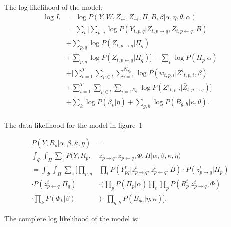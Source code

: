 \label{sec:appendix}

The log-likelihood of the model:
\begin{align}
\log L &= \log \! P(Y, W, Z_{\leftarrow}, 
Z_{\rightarrow}, \Pi, B, \beta | \alpha, \eta, \theta, \alpha) \nonumber\\
\nonumber &= \sum_{t} \bigg[ \sum_{p,q} \! \log P(Y_{t,p, q} | Z_{t,p \rightarrow q} 
     , Z_{t,p \leftarrow q}, B) \\ \nonumber 
     &+ \sum_{p,q} \log P(Z_{t, p \rightarrow q} | \Pi_q) \\ \nonumber 
     & + \sum_{p,q} \log \! P(Z_{t, p \leftarrow q} | \Pi_{q}) \bigg] 
     + \sum_{p} \log \! P(\Pi_{p} | \alpha)  \\ \nonumber 
     & + \bigg[ \sum_{t=1}^{T} \! \sum_{p \in t} \sum_{i=1}^{N_{T_{p}}} 
     \log \! P(w_{t,p,i} | Z'_{t,p,i}, \beta) \\ \nonumber 
     & + \sum_{t=1}^{T} \sum_{p \in t} \sum_{i=1^{N_{T_{p}}}} \log \! 
     P(Z'_{t,p,i} | \bar{Z}_{t, p \rightarrow q}) \bigg]   
     \\ \nonumber & + \sum_{k} \log P(\beta_{k} | 
     \eta) +  \sum_{g,h} \log P(B_{g,h} | \kappa, \theta).\\ 
     \label{eqn:LL}
\end{align}

The data likelihood for the model in figure~1

\begin{align}
P(Y, R_{p} | \alpha, \beta, \kappa, \eta) &=  \nonumber\\ 
 \int_{\Phi} \!
\int_{\Pi} \sum_{z} \! P(Y, R_{p}, & z_{p \rightarrow q}, z_{p \leftarrow q},
\Phi, \Pi | \alpha, \beta, \kappa, \eta)  \nonumber \\  \nonumber
= \int_{\Phi} \! \int_{\Pi} \sum_{z} \! \bigg[ \prod_{p,q} & \prod_{t}
P(Y_{pq}^{t} | z_{p \rightarrow q}^{t}, z_{p \leftarrow q}^{t}, B) 
\cdot P(z_{p \rightarrow q}^{t} | \Pi_{p}) \nonumber
\\  \cdot P(z_{p \leftarrow q}^{t} |
\Pi_{q})   & \cdot \bigg(\prod_{p} P(\Pi_{p} | \alpha) \prod_{t} \prod_{p}
P(R_{p}^{t} | z_{p \rightarrow q}^{t}, \Phi) \nonumber
\\ \cdot \prod_{k} P(\Phi_{k} |
\beta)&\bigg) \cdot \prod_{g,h}P(B_{gh} | \eta, \kappa) \bigg].
\end{align}

The complete log likelihood of the model is:

